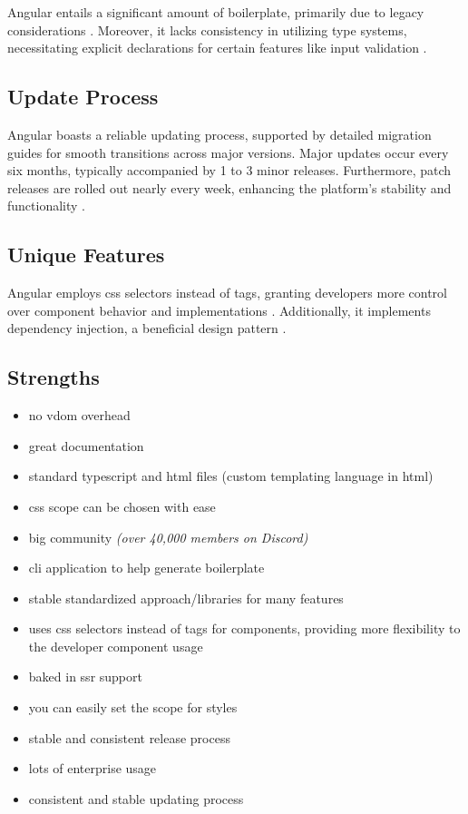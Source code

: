 Angular entails a significant amount of boilerplate, primarily due to legacy considerations \cite{angulardev:directive_composition_api}. Moreover, it lacks consistency in utilizing type systems, necessitating explicit declarations for certain features like input validation \cite{angulardev:inputs, typescript:objects}.

\subsection{Update Process}

Angular boasts a reliable updating process, supported by detailed migration guides for smooth transitions across major versions. Major updates occur every six months, typically accompanied by 1 to 3 minor releases. Furthermore, patch releases are rolled out nearly every week, enhancing the platform's stability and functionality \cite{angulardev:versioning_and_releases}.

\subsection{Unique Features}

Angular employs \acrshort{css} selectors instead of tags, granting developers more control over component behavior and implementations \cite{angulardev:component_selectors}. Additionally, it implements dependency injection, a beneficial design pattern \cite{stackify:dependency_injection, angulardev:dependency_injection}.

\subsection{Strengths}
\label{subsec:angular:strengths}
\begin{itemize}
    \item no \acrshort{vdom} overhead
    \item great documentation
    \item standard typescript and \acrshort{html} files (custom templating language in \acrshort{html})
    \item \acrshort{css} scope can be chosen with ease
    \item big community \textit{(over 40,000 members on Discord)}
    \item \acrshort{cli} application to help generate boilerplate
    \item stable standardized approach/libraries for many features
    \item uses \acrshort{css} selectors instead of tags for components, providing more flexibility to the developer component usage
    \item baked in \acrshort{ssr} support
    \item you can easily set the scope for styles
    \item stable and consistent release process \cite{angulardev:versioning_and_releases}
    \item lots of enterprise usage
    \item consistent and stable updating process
\end{itemize}

